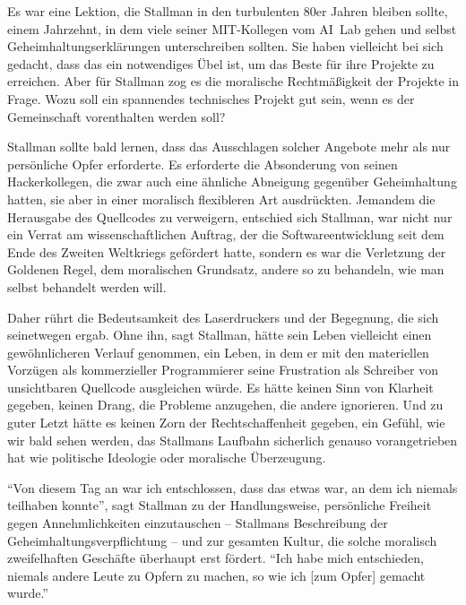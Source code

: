 Es war eine Lektion, die Stallman in den turbulenten 80er Jahren bleiben sollte, einem Jahrzehnt, in dem viele seiner MIT-Kollegen vom AI~Lab gehen und selbst Geheimhaltungserklärungen unterschreiben sollten. Sie haben vielleicht bei sich gedacht, dass das ein notwendiges Übel ist, um das Beste für ihre Projekte zu erreichen. Aber für Stallman zog es die moralische Rechtmäßigkeit der Projekte in Frage. Wozu soll ein spannendes technisches Projekt gut sein, wenn es der Gemeinschaft vorenthalten werden soll?

Stallman sollte bald lernen, dass das Ausschlagen solcher Angebote mehr als nur persönliche Opfer erforderte. Es erforderte die Absonderung von seinen Hackerkollegen, die zwar auch eine ähnliche Abneigung gegenüber Geheimhaltung hatten, sie aber in einer moralisch flexibleren Art ausdrückten. Jemandem die Herausgabe des Quellcodes zu verweigern, entschied sich Stallman, war nicht nur ein Verrat am wissenschaftlichen Auftrag, der die Softwareentwicklung seit dem Ende des Zweiten Weltkriegs gefördert hatte, sondern es war die Verletzung der Goldenen Regel, dem moralischen Grundsatz, andere so zu behandeln, wie man selbst behandelt werden will.

Daher rührt die Bedeutsamkeit des Laserdruckers und der Begegnung, die sich seinetwegen ergab. Ohne ihn, sagt Stallman, hätte sein Leben vielleicht einen gewöhnlicheren Verlauf genommen, ein Leben, in dem er mit den materiellen Vorzügen als kommerzieller Programmierer seine Frustration als Schreiber von unsichtbaren Quellcode ausgleichen würde. Es hätte keinen Sinn von Klarheit gegeben, keinen Drang, die Probleme anzugehen, die andere ignorieren. Und zu guter Letzt hätte es keinen Zorn der Rechtschaffenheit gegeben, ein Gefühl, wie wir bald sehen werden, das Stallmans Laufbahn sicherlich genauso vorangetrieben hat wie politische Ideologie oder moralische Überzeugung.

"`Von diesem Tag an war ich entschlossen, dass das etwas war, an dem ich niemals teilhaben konnte"', sagt Stallman zu der Handlungsweise, persönliche Freiheit gegen Annehmlichkeiten einzutauschen – Stallmans Beschreibung der Geheimhaltungsverpflichtung – und zur gesamten Kultur, die solche moralisch zweifelhaften Geschäfte überhaupt erst fördert. "`Ich habe mich entschieden, niemals andere Leute zu Opfern zu machen, so wie ich [zum Opfer] gemacht wurde."'
